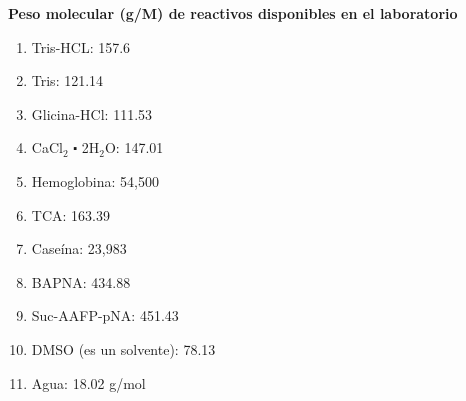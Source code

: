 \documentclass[12pt,a4paper]{article}
\begin{document}
\begin{multicols}{2}
\begin{Exercice}
\end{Exercice}

\begin{Exercice}\textbf{Peso molecular (g/M) de reactivos disponibles en el laboratorio}
	\begin{enumerate}[1)]
		\item Tris-HCL: 157.6 
		\item Tris: 121.14 
		\item Glicina-HCl: 111.53
		\item CaCl$_2$ $\centerdot$ 2H$_2$O: 147.01
		\item Hemoglobina: 54,500
		\item TCA: 163.39
		\item Case\'ina: 23,983
		\item BAPNA: 434.88
		\item Suc-AAFP-pNA: 451.43
		\item DMSO (es un solvente): 78.13
		\item Agua: 18.02 g/mol
	\end{enumerate}
\end{Exercice}

\end{multicols}
\end{document}
